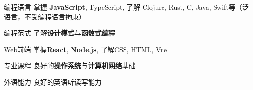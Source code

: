 

\begin{cvskills}

    \cvskill
    {编程语言} %
    {掌握 \textbf{JavaScript}, TypeScript, 了解 Clojure, Rust, C, Java, Swift等（泛语言，不受编程语言拘束）} %

    \cvskill
    {编程范式} %
    {了解\textbf{设计模式}与\textbf{函数式编程}} %

    \cvskill
    {Web前端} %
    {掌握\textbf{React}, \textbf{Node.js}, 了解CSS, HTML, Vue} %

    \cvskill
    {专业课程} %
    {良好的\textbf{操作系统}与\textbf{计算机网络}基础} %

    \cvskill
    {外语能力} %
    {良好的英语听读写能力} %

\end{cvskills}
